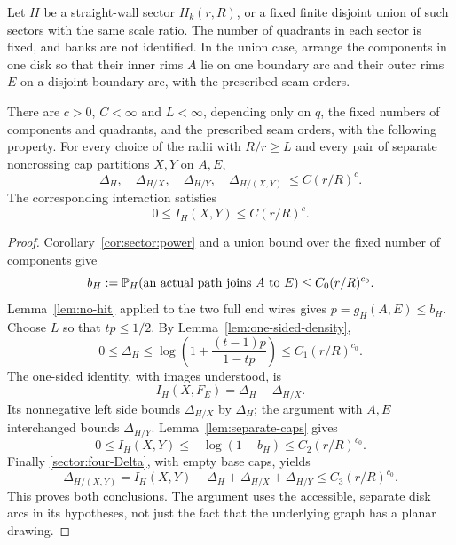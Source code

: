 \begin{lemma}
\label{lem:sector:cap-pressure}
Let $H$ be a straight-wall sector $H_k(r,R)$, or a fixed finite
disjoint union of such sectors with the same scale ratio.  The number
of quadrants in each sector is fixed, and banks are not identified.
In the union case, arrange the components in one disk so that their
inner rims $A$ lie on one boundary arc and their outer rims $E$ on a
disjoint boundary arc, with the prescribed seam orders.

There are $c>0$, $C<\infty$ and $L<\infty$, depending only on $q$,
the fixed numbers of components and quadrants, and the prescribed
seam orders, with the following property.  For every choice of the
radii with $R/r\ge L$ and every pair of separate noncrossing cap
partitions $X,Y$ on $A,E$,
\begin{equation}
 \Delta_H,\quad \Delta_{H/X},\quad \Delta_{H/Y},\quad
 \Delta_{H/(X,Y)}\ \le C(r/R)^c.
 \label{sector:clean-four-bounds}
\end{equation}
The corresponding interaction satisfies
\begin{equation}
 0\le I_H(X,Y)\le C(r/R)^c.
 \label{sector:clean-I-bound}
\end{equation}
\end{lemma}

\begin{proof}
Corollary~\ref{cor:sector:power} and a union bound over the fixed
number of components give
\[
 b_H:=\mathbb P_H(\text{an actual path joins }A\text{ to }E)
 \le C_0(r/R)^{c_0}.
\]
Lemma~\ref{lem:no-hit} applied to the two full end wires gives
$p=g_H(A,E)\le b_H$.  Choose $L$ so that $tp\le1/2$.  By
Lemma~\ref{lem:one-sided-density},
\[
 0\le\Delta_H\le
 \log\left(1+\frac{(t-1)p}{1-tp}\right)
 \le C_1(r/R)^{c_0}.
\]
The one-sided identity, with images understood, is
\[
 I_H(X,F_E)=\Delta_H-\Delta_{H/X}.
\]
Its nonnegative left side bounds $\Delta_{H/X}$ by $\Delta_H$;
the argument with $A,E$ interchanged bounds $\Delta_{H/Y}$.
Lemma~\ref{lem:separate-caps} gives
\[
 0\le I_H(X,Y)\le-\log(1-b_H)\le C_2(r/R)^{c_0}.
\]
Finally \eqref{sector:four-Delta}, with empty base caps, yields
\[
 \Delta_{H/(X,Y)}
 =I_H(X,Y)-\Delta_H+\Delta_{H/X}+\Delta_{H/Y}
 \le C_3(r/R)^{c_0}.
\]
This proves both conclusions.  The argument uses the accessible,
separate disk arcs in its hypotheses, not just the fact that the
underlying graph has a planar drawing.
\end{proof}

